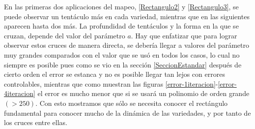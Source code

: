 En las primeras dos aplicaciones del mapeo, \ref{Rectangulo2} y \ref{Rectangulo3}, se puede observar un tentáculo más en cada variedad, mientras que en las siguientes aparecen hasta dos más. La profundidad de tentáculos y la forma en la que se cruzan, depende del valor del parámetro $a$. Hay que enfatizar que para lograr observar estos cruces de manera directa, se debería llegar a valores del parámetro muy grandes comparados con el valor que se usó en todos los casos, lo cual no siempre es posible pues como se vio en la sección \ref{SeccionEstandar} después de cierto orden el error se estanca y no es posible llegar tan lejos con errores controlables, mientras que como muestran las figuras \ref{error-1iteracion}-\ref{error-4iteracion} el error es mucho menor que si se usará un polinomio de orden grande$(>250)$. Con esto mostramos que sólo se necesita conocer el rectángulo fundamental para conocer mucho de la dinámica de las variedades, y por tanto de los cruces entre ellas. 


